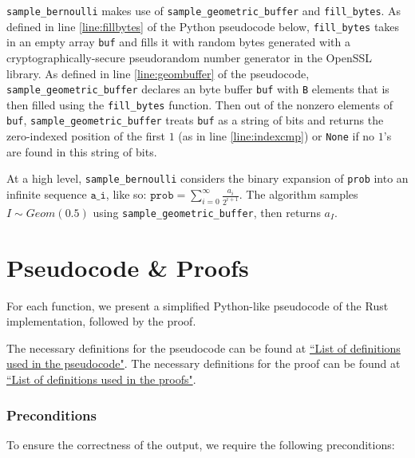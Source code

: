\documentclass[11pt,a4paper]{article}
\newcommand{\vicki}[1]{{ {\color{olive}{(vicki)~#1}}}}
\theoremstyle{definition}
\begin{document}
\vicki{high-level walkthrough - should this be a separate section?} 
\texttt{sample\_bernoulli} makes use of \texttt{sample\_geometric\_buffer} and \texttt{fill\_bytes}. As defined in line \ref{line:fillbytes} of the Python pseudocode below, \texttt{fill\_bytes} takes in an empty array \texttt{buf} and fills it with random bytes generated with a cryptographically-secure pseudorandom number generator in the OpenSSL library. As defined in line \ref{line:geombuffer} of the pseudocode, \texttt{sample\_geometric\_buffer} declares an byte buffer \texttt{buf} with \texttt{B} elements that is then filled using the \texttt{fill\_bytes} function. Then out of the nonzero elements of \texttt{buf}, \texttt{sample\_geometric\_buffer} treats \texttt{buf} as a string of bits and returns the zero-indexed position of the first $1$ (as in line \ref{line:indexcmp}) or \texttt{None} if no $1$'s are found in this string of bits. 

At a high level, \texttt{sample\_bernoulli} considers the binary expansion of \texttt{prob} into an infinite sequence $\texttt{a\_i}$, like so: $\texttt{prob} = \sum_{i = 0}^{\infty} \frac{a_i}{2^{i + 1}}$. The algorithm samples $I \sim Geom(0.5)$ using \texttt{sample\_geometric\_buffer}, then returns $a_I$. 

\section{Pseudocode \& Proofs}
For each function, we present a simplified Python-like pseudocode of the Rust implementation, followed by the proof. \vicki{later when we make this modular (i.e. sorted into functions relating to bernoulli, functions relating to geometric, etc.), each function will be a separate theorem.}

The necessary definitions for the pseudocode can be found at \href{https://github.com/opendp/whitepapers/blob/pseudocode-defns/pseudocode-defns/pseudocode_defns.pdf}{``List of definitions used in the pseudocode"}. The necessary definitions for the proof can be found at \href{https://github.com/opendp/whitepapers/blob/proof-defns/proof-defns/proof_defns.pdf}{``List of definitions used in the proofs"}. \vicki{need to fix these links} 

\subsubsection*{Preconditions}
To ensure the correctness of the output, we require the following preconditions:
\end{document}
